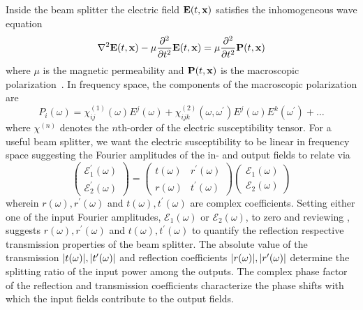 Inside the beam splitter the electric field $\vb{E}(t,\vb{x})$ satisfies the inhomogeneous wave equation
\begin{equation}
	\laplacian\vb{E}(t,\vb{x})
	-
	\mu\pdv[2]{t}\vb{E}(t,\vb{x})
	=
	\mu\pdv[2]{t}\vb{P}(t,\vb{x})
\end{equation}
where $\mu$ is the magnetic permeability and $\vb{P}(t,\vb{x})$ is the macroscopic polarization~\cite[p.~86]{Murti2014}.
In frequency space, the components of the macroscopic polarization are~\cite[p.~1070]{Mandel1995}
\begin{equation}
	P_i(\omega)
	=
	\chi^{(1)}_{ij}(\omega)E^j(\omega)
	+
	\chi^{(2)}_{ijk}(\omega,\omega^\prime)E^j(\omega)E^k(\omega^\prime)
	+
	\dots
\end{equation}
where $\chi^{(n)}$ denotes the $n$th-order of the electric susceptibility tensor.
For a useful beam splitter, we want the electric susceptibility to be linear in frequency space suggesting the Fourier amplitudes of the in- and output fields to relate via
\begin{equation}
    \begin{pmatrix}
        \mathcal{E}_1^\prime(\omega)
        \\
        \mathcal{E}_2^\prime(\omega)
    \end{pmatrix}
    =
    \begin{pmatrix}
        t(\omega) & r^\prime(\omega)
        \\
        r(\omega) & t^\prime(\omega)
    \end{pmatrix}
    \begin{pmatrix}
        \mathcal{E}_1(\omega)
        \\
        \mathcal{E}_2(\omega)
    \end{pmatrix}
    \label{eq:beam_splitter_transform}
\end{equation}
wherein $r(\omega),r^\prime(\omega)$ and $t(\omega),t^\prime(\omega)$ are complex coefficients.
Setting either one of the input Fourier amplitudes, $\mathcal{E}_1(\omega)$ or $\mathcal{E}_2(\omega)$, to zero and reviewing , suggests $r(\omega),r^\prime(\omega)$ and $t(\omega),t^\prime(\omega)$ to quantify the reflection respective transmission properties of the beam splitter.
The absolute value of the transmission $\abs{t(\omega)},\abs{t^\prime(\omega)}$ and reflection coefficients $\abs{r(\omega)},\abs{r^\prime(\omega)}$ determine the splitting ratio of the input power among the outputs.
The complex phase factor of the reflection and transmission coefficients characterize the phase shifts with which the input fields contribute to the output fields.

